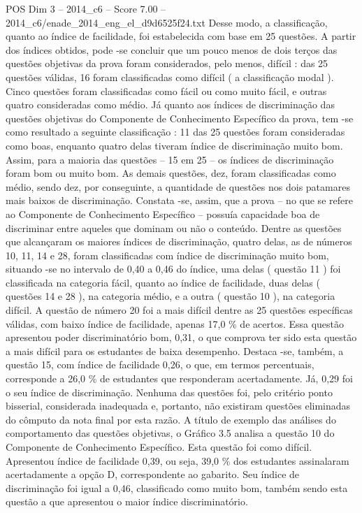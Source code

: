 \begin{textsample}{POS Dim 3 – 2014\_c6 – Score 7.00 – 2014\_c6/enade\_2014\_eng\_el\_d9d6525f24.txt}
Desse modo, a classificação, quanto ao índice de facilidade, foi estabelecida com base em 25 questões.
A partir dos índices obtidos, pode -se concluir que um pouco menos de dois terços das questões objetivas da prova foram considerados, pelo menos, difícil : das 25 questões válidas, 16 foram classificadas como difícil ( a classificação modal ).
Cinco questões foram classificadas como fácil ou como muito fácil, e outras quatro consideradas como médio.
Já quanto aos índices de discriminação das questões objetivas do Componente de Conhecimento Específico da prova, tem -se como resultado a seguinte classificação : 11 das 25 questões foram consideradas como boas, enquanto quatro delas tiveram índice de discriminação muito bom.
Assim, para a maioria das questões – 15 em 25 – os índices de discriminação foram bom ou muito bom.
As demais questões, dez, foram classificadas como médio, sendo dez, por conseguinte, a quantidade de questões nos dois patamares mais baixos de discriminação.
Constata -se, assim, que a prova – no que se refere ao Componente de Conhecimento Específico – possuía capacidade boa de discriminar entre aqueles que dominam ou não o conteúdo.
Dentre as questões que alcançaram os maiores índices de discriminação, quatro delas, as de números 10, 11, 14 e 28, foram classificadas com índice de discriminação muito bom, situando -se no intervalo de 0,40 a 0,46 do índice, uma delas ( questão 11 ) foi classificada na categoria fácil, quanto ao índice de facilidade, duas delas ( questões 14 e 28 ), na categoria médio, e a outra ( questão 10 ), na categoria difícil.
A questão de número 20 foi a mais difícil dentre as 25 questões específicas válidas, com baixo índice de facilidade, apenas 17,0 \% de acertos.
Essa questão apresentou poder discriminatório bom, 0,31, o que comprova ter sido esta questão a mais difícil para os estudantes de baixa desempenho.
Destaca -se, também, a questão 15, com índice de facilidade 0,26, o que, em termos percentuais, corresponde a 26,0 \% de estudantes que responderam acertadamente.
Já, 0,29 foi o seu índice de discriminação.
Nenhuma das questões foi, pelo critério ponto bisserial, considerada inadequada e, portanto, não existiram questões eliminadas do cômputo da nota final por esta razão.
A título de exemplo das análises do comportamento das questões objetivas, o Gráfico 3.5 analisa a questão 10 do Componente de Conhecimento Específico.
Esta questão foi como difícil.
Apresentou índice de facilidade 0,39, ou seja, 39,0 \% dos estudantes assinalaram acertadamente a opção D, correspondente ao gabarito.
Seu índice de discriminação foi igual a 0,46, classificado como muito bom, também sendo esta questão a que apresentou o maior índice discriminatório.

\end{textsample}
